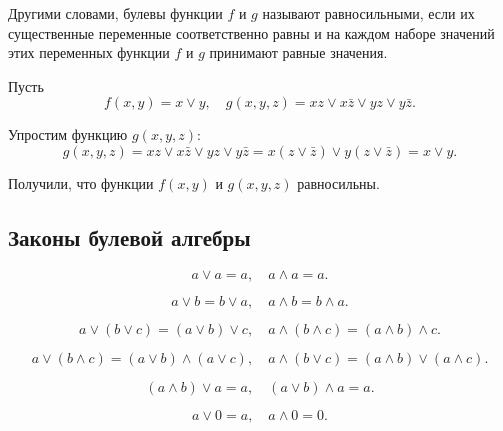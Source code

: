 Другими словами, булевы функции \(f\) и \(g\) называют равносильными, если их существенные переменные соответственно равны и на каждом наборе значений этих переменных функции \(f\) и \(g\) принимают равные значения.

\begin{example*}
    Пусть
    \[
        f(x, y) = x \lor y,
        \quad
        g(x, y, z) = xz \lor x \bar{z} \lor yz \lor y \bar{z}.
    \]

    Упростим функцию \(g(x, y, z)\):
    \[
        g(x, y, z) =
        xz \lor x \bar{z} \lor yz \lor y \bar{z} =
        x(z \lor \bar{z}) \lor y(z \lor \bar{z}) =
        x \lor y.
    \]

    Получили, что функции \(f(x, y)\) и \(g(x, y, z)\) равносильны.
\end{example*}

\subsection{Законы булевой алгебры}

\begin{property}[Идемпотентность]
    \[
        a \lor a = a,
        \quad
        a \land a = a.
    \]
\end{property}

\begin{property}[Коммутативность]
    \[
        a \lor b = b \lor a,
        \quad
        a \land b = b \land a.
    \]
\end{property}

\begin{property}[Ассоциативность]
    \[
        a \lor (b \lor c) = (a \lor b) \lor c,
        \quad
        a \land (b \land c) = (a \land b) \land c.
    \]
\end{property}

\begin{property}[Дистрибутивность]
    \[
        a \lor (b \land c) = (a \lor b) \land (a \lor c),
        \quad
        a \land (b \lor c) = (a \land b) \lor (a \land c).
    \]
\end{property}

\begin{property}[Поглощение]
    \[
        (a \land b) \lor a = a,
        \quad
        (a \lor b) \land a = a.
    \]
\end{property}

\begin{property}
    \[
        a \lor 0 = a,
        \quad
        a \land 0 = 0.
    \]
\end{property}

